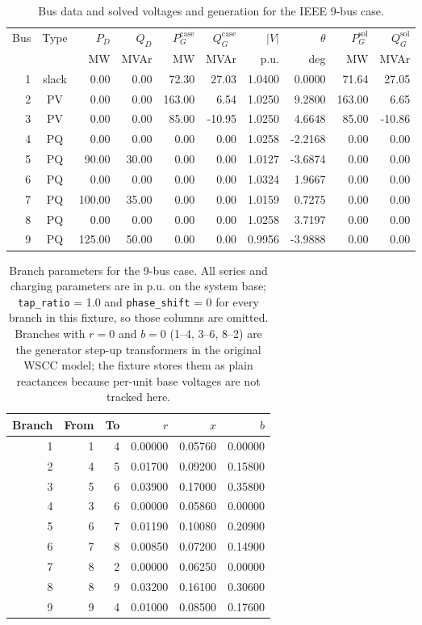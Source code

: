 \documentclass[11pt]{article}
\begin{document}
\begin{table}[htbp]
\centering
\caption{Bus data and solved voltages and generation for the IEEE 9-bus
case.}
\small
\setlength{\tabcolsep}{3pt}
\begin{tabular}{@{}rcrrrrrrrr@{}}
\toprule
Bus & Type & $P_D$ & $Q_D$ & $P_G^{\mathrm{case}}$ & $Q_G^{\mathrm{case}}$ &
$|V|$ & $\theta$ & $P_G^{\mathrm{sol}}$ & $Q_G^{\mathrm{sol}}$ \\
 & & MW & MVAr & MW & MVAr & p.u. & deg & MW & MVAr \\
\midrule
1 & slack & 0.00 & 0.00 & 72.30 & 27.03 & 1.0400 & 0.0000 & 71.64 & 27.05 \\
2 & PV & 0.00 & 0.00 & 163.00 & 6.54 & 1.0250 & 9.2800 & 163.00 & 6.65 \\
3 & PV & 0.00 & 0.00 & 85.00 & -10.95 & 1.0250 & 4.6648 & 85.00 & -10.86 \\
4 & PQ & 0.00 & 0.00 & 0.00 & 0.00 & 1.0258 & -2.2168 & 0.00 & 0.00 \\
5 & PQ & 90.00 & 30.00 & 0.00 & 0.00 & 1.0127 & -3.6874 & 0.00 & 0.00 \\
6 & PQ & 0.00 & 0.00 & 0.00 & 0.00 & 1.0324 & 1.9667 & 0.00 & 0.00 \\
7 & PQ & 100.00 & 35.00 & 0.00 & 0.00 & 1.0159 & 0.7275 & 0.00 & 0.00 \\
8 & PQ & 0.00 & 0.00 & 0.00 & 0.00 & 1.0258 & 3.7197 & 0.00 & 0.00 \\
9 & PQ & 125.00 & 50.00 & 0.00 & 0.00 & 0.9956 & -3.9888 & 0.00 & 0.00 \\
\bottomrule
\end{tabular}
\end{table}

\begin{table}[htbp]
\centering
\caption{Branch parameters for the 9-bus case. All series and charging
parameters are in p.u. on the system base; \texttt{tap\_ratio} = 1.0 and
\texttt{phase\_shift} = 0 for every branch in this fixture, so those
columns are omitted. Branches with $r=0$ and $b=0$ (1--4, 3--6, 8--2) are
the generator step-up transformers in the original WSCC model; the
fixture stores them as plain reactances because per-unit base voltages
are not tracked here.}
\begin{tabular}{@{}rrrrrr@{}}
\toprule
Branch & From & To & $r$ & $x$ & $b$ \\
\midrule
1 & 1 & 4 & 0.00000 & 0.05760 & 0.00000 \\
2 & 4 & 5 & 0.01700 & 0.09200 & 0.15800 \\
3 & 5 & 6 & 0.03900 & 0.17000 & 0.35800 \\
4 & 3 & 6 & 0.00000 & 0.05860 & 0.00000 \\
5 & 6 & 7 & 0.01190 & 0.10080 & 0.20900 \\
6 & 7 & 8 & 0.00850 & 0.07200 & 0.14900 \\
7 & 8 & 2 & 0.00000 & 0.06250 & 0.00000 \\
8 & 8 & 9 & 0.03200 & 0.16100 & 0.30600 \\
9 & 9 & 4 & 0.01000 & 0.08500 & 0.17600 \\
\bottomrule
\end{tabular}
\end{table}
\end{document}
